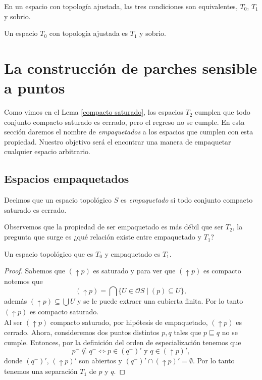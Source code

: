 \begin{lem}
    En un espacio con topología ajustada, las tres condiciones son equivalentes, $T_0$, $T_1$ y sobrio.
\end{lem}

\begin{cor}
    Un espacio $T_0$ con topología ajustada es $T_1$ y sobrio.
\end{cor}

\section{La construcción de parches sensible a puntos}\label{Parche puntos}

Como vimos en el Lema \ref{compacto saturado}, los espacios $T_2$ cumplen que todo conjunto compacto saturado es cerrado, pero el regreso no se cumple.  En esta sección daremos el nombre de \emph{empaquetados} a los espacios que cumplen con esta propiedad. Nuestro objetivo será el encontrar una manera de empaquetar cualquier espacio arbitrario.

\subsection{Espacios empaquetados}

\begin{dfn}\label{empaquetado}
    Decimos que un espacio topológico $S$ es \emph{empaquetado} si todo conjunto compacto saturado es cerrado. 
\end{dfn}

Observemos que la propiedad de ser empaquetado es más débil que ser $T_2$, la pregunta que surge es ¿qué relación existe entre empaquetado y $T_1$?

\begin{lem}\label{Empaquetado y T1}
    Un espacio topológico que es $T_0$ y empaquetado es $T_1$.
\end{lem}

\begin{proof}
    Sabemos que $(\uparrow p)$ es saturado y para ver que $(\uparrow p)$ es compacto notemos que 
    \[
    (\uparrow p)=\bigcap\{U\in \mathcal{O}S\mid (p)\subseteq U\},
    \]
    además $(\uparrow p)\subseteq \bigcup U$ y se le puede extraer una cubierta finita. Por lo tanto $(\uparrow p)$ es compacto saturado.\\

    Al ser $(\uparrow p)$ compacto saturado, por hipótesis de empaquetado, $(\uparrow p)$ es cerrado. Ahora, consideremos dos puntos distintos $p, q$ tales que $p\sqsubseteq q$ no se cumple. Entonces, por la definición del orden de especialización tenemos que 
    \[
    p^-\nsubseteq q^- \Leftrightarrow p\in (q^-)'\mbox{ y } q\in (\uparrow p)',
    \]
    donde $(q^-)'$, $(\uparrow p)'$ son abiertos y $(q^-)' \cap (\uparrow p)'=\emptyset$. Por lo tanto tenemos una separación $T_1$ de $p$ y $q$.
\end{proof}

